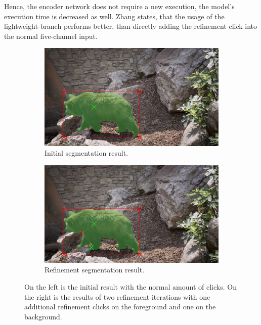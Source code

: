 Hence, the encoder network does not require a new execution, the model's execution time is decreased as well.
Zhang states, that the usage of the lightweight-branch performs better, than directly adding the refinement click into the normal five-channel input.

\begin{figure} 
	\centering
	\begin{subfigure}[b]{0.45\textwidth}
		\centering
		\includegraphics[width=\textwidth]{figures/chap34_bear_6.png}
		\caption{Initial segmentation result.}
		\label{fig:ch3:sec4:refinement_1}
	\end{subfigure}
	\hfill
	\begin{subfigure}[b]{0.45\textwidth}
		\centering
		\includegraphics[width=\textwidth]{figures/chap34_bear_8.png}
		\caption{Refinement segmentation result.}
		\label{fig:ch3:sec4:refinement_2}
	\end{subfigure}
	\caption[IOG Refinement]{
		On the left is the initial result with the normal amount of clicks. 
		On the right is the results of two refinement iterations with one additional refinement clicks on the foreground and one on the background.
	} \label{fig:ch3:sec4:refinement}
\end{figure}


